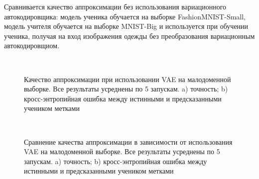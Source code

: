 Сравнивается качество аппроксимации без использования вариационного автокодировщика: модель ученика обучается на выборке FashionMNIST-Small, модель учителя обучается на выборке MNIST-Big и используется при обучении ученика, получая на вход изображения одежды без преобразования вариационным автокодировщиом.\\

\begin{figure}[h!t]\center
{}
\\
\caption{Качество аппроксимации при использовании VAE на малодоменной выборке. Все результаты усреднены по 5 запускам. a) точность; b) кросс-энтропийная ошибка между истинными и предсказанными учеником метками}
\end{figure}

\begin{figure}[h!t]\center
{}
\\
\caption{Сравнение качества аппроксимации в зависимости от использования VAE на малодоменной выборке. Все результаты усреднены по 5 запускам. a) точность; b) кросс-энтропийная ошибка между истинными и предсказанными учеником метками}
\end{figure}

